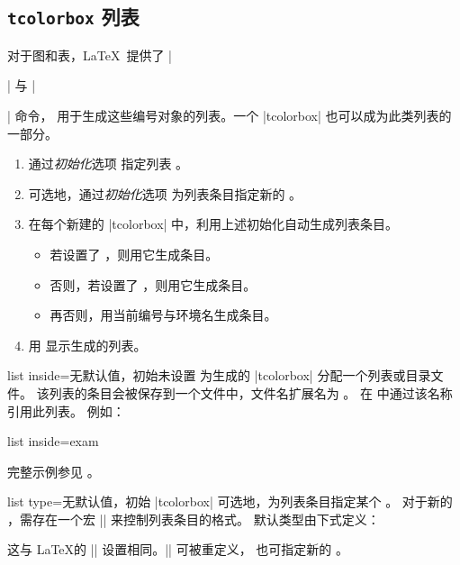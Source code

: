 \clearpage
\subsection{\texttt{tcolorbox} 列表}\label{sec:listsof}
对于图和表，\LaTeX\ 提供了 |\listoffigures| 与 |\listoftables| 命令，
用于生成这些编号对象的列表。一个 |tcolorbox| 也可以成为此类列表的一部分。
\begin{enumerate}
\item 通过\emph{初始化}选项  指定列表 。
\item 可选地，通过\emph{初始化}选项 
  为列表条目指定新的 。
\item 在每个新建的 |tcolorbox| 中，利用上述初始化自动生成列表条目。
  \begin{itemize}
  \item 若设置了 ，则用它生成条目。
  \item 否则，若设置了 ，则用它生成条目。
  \item 再否则，用当前编号与环境名生成条目。
  \end{itemize}
\item 用  显示生成的列表。
\end{enumerate}

\begin{newTcbKey}{list inside}{=}{无默认值，初始未设置}
  为生成的 |tcolorbox| 分配一个列表或目录文件。
  该列表的条目会被保存到一个文件中，文件名扩展名为 。
  在  中通过该名称引用此列表。
  例如：
\begin{dispListing}
list inside=exam
\end{dispListing}
完整示例参见 。
\end{newTcbKey}


\begin{newTcbKey}{list type}{=}{无默认值，初始 |tcolorbox|}
  可选地，为列表条目指定某个 。
  对于新的 ，需存在一个宏 |\l@| 来控制列表条目的格式。
  默认类型由下式定义：
\begin{dispListing}
\newcommand*\l@tcolorbox{\@dottedtocline{1}{1.5em}{2.3em}}
\end{dispListing}
这与 \LaTeX 的 |\l@section| 设置相同。|\l@tcolorbox| 可被重定义，
也可指定新的 。
\end{newTcbKey}



